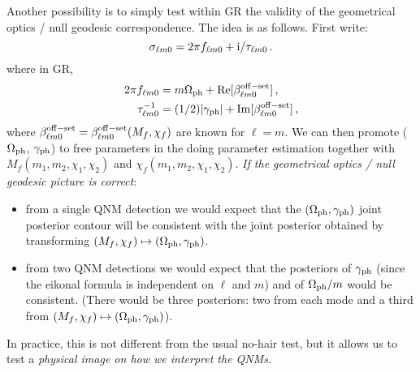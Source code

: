 \documentclass[aps,10pt,preprint,
               notitlepage,onecolumn,superscriptaddress,
               eqsecnum,
               nofootinbib,tightenlines,floatfix]{revtex4-1}
\newcommand{\ii}{{\rm i}}
\begin{document}
Another possibility is to simply test within GR the validity of the geometrical optics / null
geodesic correspondence. The idea is as follows. First write:
%
\begin{equation}
    \sigma_{\ell m 0} = 2 \pi f_{\ell m 0} + \ii / \tau_{\ell m 0}\,.
\end{equation}
%
where in GR,
%
\begin{subequations}
\begin{align}
    2 \pi f_{\ell m 0} &= m \Omega_{\rm ph} + {\rm  Re}[\beta^{\rm off-set}_{\ell m 0}]\,,
    \\
    \tau^{-1}_{\ell m 0} &= (1/2) |\gamma_{\rm ph}|+ {\rm  Im}[\beta^{\rm off-set}_{\ell m 0}]\,,
\label{eq:re_im_eikonal}
\end{align}
\end{subequations}
%
where $\beta^{\rm off-set}_{\ell m 0} = \beta^{\rm off-set}_{\ell m 0}(M_f, \chi_f)$ are known for $\ell = m $.
%
We can then promote ($\Omega_{\rm ph}$, $\gamma_{\rm ph}$) to free parameters in the
doing parameter estimation together with $M_f(m_1, m_2, \chi_1, \chi_2)$ and $\chi_f(m_1, m_2, \chi_1, \chi_2)$.
%
\emph{If the geometrical optics / null geodesic picture is correct}:
%
\begin{itemize}
    \item from a single QNM detection we would expect that the $(\Omega_{\rm ph}, \gamma_{\rm ph})$ joint posterior contour will be consistent
    with the joint posterior obtained by transforming $(M_f, \chi_f) \mapsto (\Omega_{\rm ph}, \gamma_{\rm ph})$.
    \item from two QNM detections we would expect that the posteriors of $\gamma_{\rm ph}$ (since
    the eikonal formula is independent on $\ell$ and $m$) and of $\Omega_{\rm ph} / m$ would be consistent. (There would be three posteriors: two from each mode
    and a third from $(M_f, \chi_f) \mapsto (\Omega_{\rm ph}, \gamma_{\rm ph})$).
\end{itemize}

In practice, this is not different from the usual no-hair test, but it allows us to test a \emph{physical image
on how we interpret the QNMs}.
\end{document}
